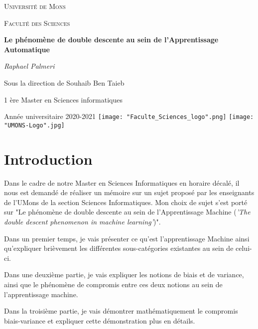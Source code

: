 \documentclass[a4paper]{article}
\author{Raphael Palmeri\\1 ère Master en Sciences Informatiques\\ 2020-2021}
\begin{document}
\begin{titlepage}
	\centering
	{\scshape\LARGE Université de Mons \par}
	\vspace{1cm}
	{\scshape\large Faculté des Sciences \par}
	\vspace{1.5cm}
	{\huge\bfseries Le phénomène de double descente au sein de l'Apprentissage Automatique \par}
	\vspace{2cm}
	{\Large\itshape Raphael Palmeri \par}
	\vspace{2.5cm}
	{Sous la direction de Souhaib Ben Taieb \par}
	\vspace{1.5cm}
	{1 ère Master en Sciences informatiques \par}
	\vspace{5cm}
	Année universitaire 2020-2021
	\vfill
	\texttt{[image: "Faculte\_Sciences\_logo".png]}
	\hfill
	\texttt{[image: "UMONS-Logo".jpg]}
\end{titlepage}
\newpage
\thispagestyle{empty}
\mbox{}
\newpage

\tableofcontents
\newpage

\section{Introduction}
Dans le cadre de notre Master en Sciences Informatiques en horaire décalé, il nous est demandé de réaliser un mémoire sur un sujet proposé par les enseignants de l'UMons de la section Sciences Informatiques. Mon choix de sujet s'est porté sur "Le phénomène de double descente au sein de l'Apprentissage Machine (\textit{'The double descent phenomenon in machine learning'})".\newline

Dans un premier temps, je vais présenter ce qu'est l'apprentissage Machine ainsi qu'expliquer brièvement les différentes sous-catégories existantes au sein de celui-ci. \newline

Dans une deuxième partie, je vais expliquer les notions de biais et de variance, ainsi que le phénomène de compromis entre ces deux notions au sein de l'apprentissage machine. \newline

Dans la troisième partie, je vais démontrer mathématiquement le compromis biais-variance et expliquer cette démonstration plus en détails. \newline
\end{document}
